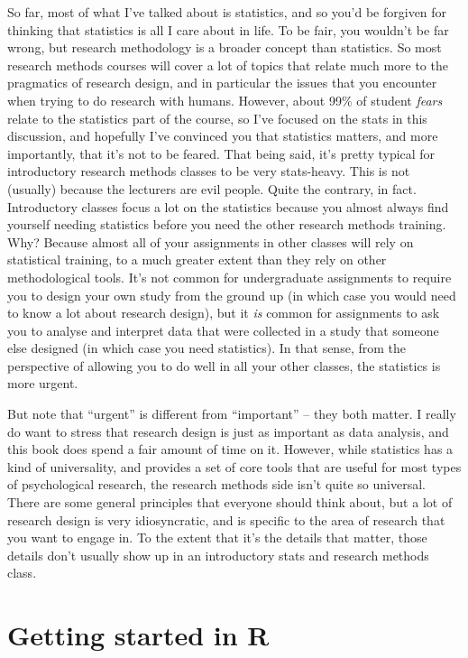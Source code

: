 \documentclass[]{book}
\begin{document}
So far, most of what I've talked about is statistics, and so you'd be forgiven for thinking that statistics is all I care about in life. To be fair, you wouldn't be far wrong, but research methodology is a broader concept than statistics. So most research methods courses will cover a lot of topics that relate much more to the pragmatics of research design, and in particular the issues that you encounter when trying to do research with humans. However, about 99\% of student \emph{fears} relate to the statistics part of the course, so I've focused on the stats in this discussion, and hopefully I've convinced you that statistics matters, and more importantly, that it's not to be feared. That being said, it's pretty typical for introductory research methods classes to be very stats-heavy. This is not (usually) because the lecturers are evil people. Quite the contrary, in fact. Introductory classes focus a lot on the statistics because you almost always find yourself needing statistics before you need the other research methods training. Why? Because almost all of your assignments in other classes will rely on statistical training, to a much greater extent than they rely on other methodological tools. It's not common for undergraduate assignments to require you to design your own study from the ground up (in which case you would need to know a lot about research design), but it \emph{is} common for assignments to ask you to analyse and interpret data that were collected in a study that someone else designed (in which case you need statistics). In that sense, from the perspective of allowing you to do well in all your other classes, the statistics is more urgent.

But note that ``urgent'' is different from ``important'' -- they both matter. I really do want to stress that research design is just as important as data analysis, and this book does spend a fair amount of time on it. However, while statistics has a kind of universality, and provides a set of core tools that are useful for most types of psychological research, the research methods side isn't quite so universal. There are some general principles that everyone should think about, but a lot of research design is very idiosyncratic, and is specific to the area of research that you want to engage in. To the extent that it's the details that matter, those details don't usually show up in an introductory stats and research methods class.

\hypertarget{r-start}{%
\chapter{Getting started in R}\label{r-start}}
\end{document}
